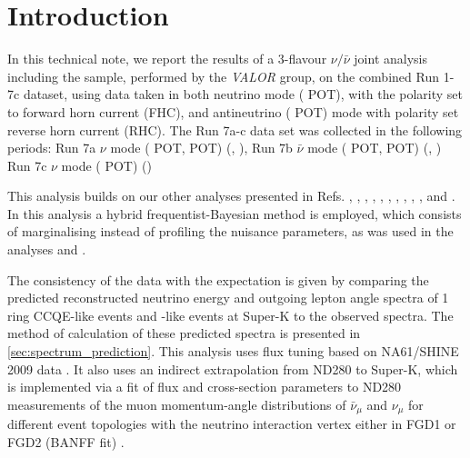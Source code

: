 
\section {Introduction}
\label{sec:intro}

In this technical note, we report the results of a 3-flavour $\nu/\bar{\nu}$ joint analysis including the \nueCConepi{} sample,
performed by the {\em VALOR} group,        
on the combined Run 1-7c dataset, using data taken in both 
neutrino mode (\TotalPotNuRunOneSevenC{} POT),
with the polarity set to forward horn current (FHC),
and antineutrino (\TotalPotNuBarRunOneSevenC{} POT) mode
with polarity set reverse horn current (RHC).
The Run 7a-c data set was collected in the following periods: Run 7a \( \nu \) mode (\RunSevenAPOTOne{} POT, \RunSevenAPOTTwo{} POT) (\RunSevenADatesOne{},   \RunSevenADatesTwo{}), Run 7b \( \bar{\nu} \) mode (\RunSevenBPOTOne{} POT, \RunSevenBPOTTwo{} POT) (\RunSevenBDatesOne{},   \RunSevenBDatesTwo{} ) Run 7c \( \nu \) mode (\RunSevenCPOTOne{} POT) (\RunSevenCDatesOne{})

This analysis builds on our other analyses presented in Refs. 
\cite{OurRun1DisappAnalysis},
\cite{OurRun12DisappAnalysis}, 
\cite{OurRun12DisappAnalysis3Flavour},
\cite{OurRun123DisappAnalysis3Flavour},
\cite{OurRun1234aDisappAnalysis3Flavour},
\cite{OurRun1234DisappAnalysis3Flavour},
\cite{OurRun123JointOscillationAnalysis},
\cite{OurRun1234JointOscillationAnalysis},
\cite{OurRun56AntiNumuDisappearanceAnalysis3Flavour},
\cite{OurRun56AntiNueBarAppearanceAnalysis3Flavour},
and
\cite{OurRun1617b17cJointAnalysis3Flavour}.
In this analysis a hybrid frequentist-Bayesian method \cite{CousinsHighland} is employed, which consists of marginalising instead of profiling the nuisance parameters, as was used in the analyses \cite{OurRun56AntiNueBarAppearanceAnalysis3Flavour} and \cite{OurRun1617b17cJointAnalysis3Flavour}.

The consistency of the data with the expectation is given by comparing the predicted reconstructed neutrino energy 
and outgoing lepton angle spectra of 1 ring CCQE-like events and \nueCConepi{}-like events at Super-K to the observed spectra. 
The method of calculation of these predicted spectra is presented in \cref{sec:spectrum_prediction}.
This analysis uses flux tuning based on NA61/SHINE 2009 data \cite{FluxTuning}\cite{NA61/SHINET2K}. 
It also uses an indirect extrapolation from ND280 to Super-K, which is implemented via a fit of flux and cross-section parameters to
ND280 measurements of the muon momentum-angle distributions of $\bar{\nu}_\mu$ and  $\nu_\mu$
for different event topologies
with the neutrino interaction vertex either in FGD1 or FGD2 (BANFF fit) \cite{BANFF2016}.


